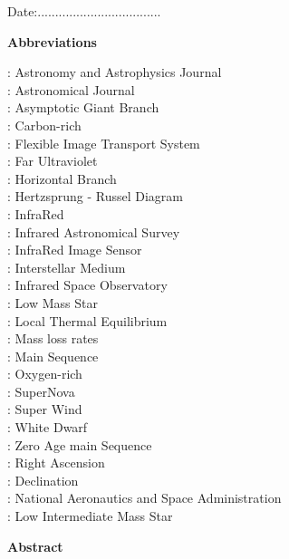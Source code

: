 \documentclass[12pt,a4paper]{report}
\begin{document}
\vspace{2cm}
\begin{center}
	Date:...................................
\end{center}
\clearpage
{}
\begin{center}
	\Large{ \bfseries{Abbreviations}}
\end{center}
: Astronomy and Astrophysics Journal\\
: Astronomical Journal\\
: Asymptotic Giant Branch\\
: Carbon-rich\\
: Flexible Image Transport System\\ 
: Far Ultraviolet\\
: Horizontal Branch\\
: Hertzsprung - Russel Diagram\\
: InfraRed\\
: Infrared Astronomical Survey\\
: InfraRed Image Sensor\\
: Interstellar Medium\\
: Infrared Space Observatory\\
: Low Mass Star\\
: Local Thermal Equilibrium\\
: Mass loss rates\\
: Main Sequence\\
: Oxygen-rich\\
: SuperNova\\
: Super Wind\\
: White Dwarf\\
: Zero Age main Sequence\\
: Right Ascension\\
: Declination\\
: National Aeronautics and Space Administration\\
: Low Intermediate Mass Star\\
\clearpage
{}
\begin{center}
	\Large{ \bfseries{Abstract}}
\end{center}
\end{document}
